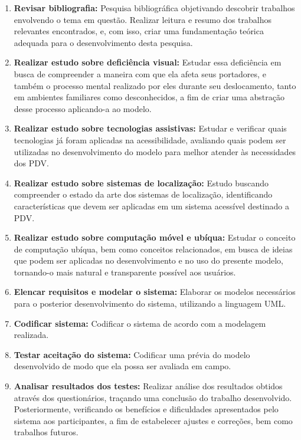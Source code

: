 \documentclass[english,brazilian]{UNISINOSmonografia}
\begin{document}
\begin{enumerate}
	\item \textbf{Revisar bibliografia:} Pesquisa bibliográfica objetivando descobrir trabalhos envolvendo o tema em questão. Realizar leitura e resumo dos trabalhos relevantes encontrados, e, com isso, criar uma fundamentação teórica adequada para o desenvolvimento desta pesquisa.
    \item \textbf{Realizar estudo sobre deficiência visual:} Estudar essa deficiência em busca de compreender a maneira com que ela afeta seus portadores, e também o processo mental realizado por eles durante seu deslocamento, tanto em ambientes familiares como desconhecidos, a fim de criar uma abstração desse processo aplicando-a ao modelo.
    \item \textbf{Realizar estudo sobre tecnologias assistivas:} Estudar e verificar quais tecnologias já foram aplicadas na acessibilidade, avaliando quais podem ser utilizadas no desenvolvimento do modelo para melhor atender às necessidades dos PDV.
    \item \textbf{Realizar estudo sobre sistemas de localização:} Estudo buscando compreender o estado da arte dos sistemas de localização, identificando características que devem ser aplicadas em um sistema acessível destinado a PDV.
    \item \textbf{Realizar estudo sobre computação móvel e ubíqua:} Estudar o conceito de computação ubíqua, bem como conceitos relacionados, em busca de ideias que podem ser aplicadas no desenvolvimento e no uso do presente modelo, tornando-o mais natural e transparente possível aos usuários.
    \item \textbf{Elencar requisitos e modelar o sistema:} Elaborar os modelos necessários para o posterior desenvolvimento do sistema, utilizando a linguagem UML.
    \item \textbf{Codificar sistema:} Codificar o sistema de acordo com a modelagem realizada.
	\item \textbf{Testar aceitação do sistema:} Codificar uma prévia do modelo desenvolvido de modo que ela possa ser avaliada em campo.
	\item \textbf{Analisar resultados dos testes:} Realizar análise dos resultados obtidos através dos questionários, traçando uma conclusão do trabalho desenvolvido. Posteriormente, verificando os benefícios e dificuldades apresentados pelo sistema aos participantes, a fim de estabelecer ajustes e correções, bem como trabalhos futuros.
\end{enumerate}
\end{document}
